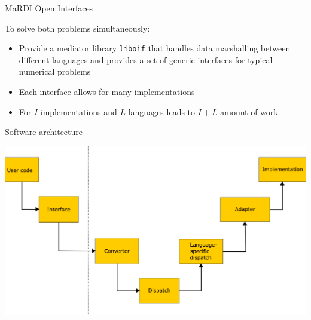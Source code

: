 \documentclass[10pt, aspectratio=169, progressbar=frametitle]{beamer}
\begin{document}
\begin{frame}{MaRDI Open Interfaces}
  \begin{minipage}{0.45\textwidth}
    To solve both problems simultaneously:
    \begin{itemize}
      \item Provide a mediator library \texttt{liboif} that handles
            data marshalling between different languages and provides a set
            of generic interfaces for typical numerical problems
      \item Each interface allows for many implementations
      \item For $I$ implementations and $L$ languages leads to $I + L$
            amount of work
    \end{itemize}
  \end{minipage}\hfill%
  \begin{minipage}{0.50\textwidth}
    
  \end{minipage}
\end{frame}

\begin{frame}{Software architecture}
  \begin{center}
    \includegraphics[scale=0.09]{arch.png}
  \end{center}
\end{frame}
\end{document}
